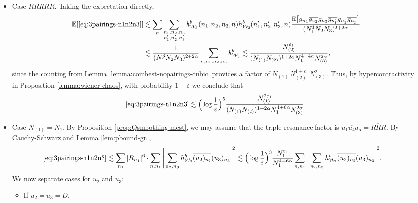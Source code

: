 \documentclass[11pt, xcolor = dvipsnames,reqno
]{amsart}
\theoremstyle{definition}
\theoremstyle{remark}
\begin{document}
    \begin{itemize}
        \item Case $RRRRR$. Taking the expectation directly, 
        \begin{align}
            \mathbb E [\eqref{eq:3pairings-n1n2n3}]
            & \lesssim  \sum_n \sum_{\substack{n_1,n_2,n_3 \\ n_1',n_2',n_3'}} h^b_{\mathcal W_3}(n_1,n_2,n_3,n) h^b_{\mathcal W_3}(n_1',n_2',n_3',n) \frac{\mathbb E \big[ g_{n_1} \overline{g_{n_2}} g_{n_3} \overline{g_{n_1'}} g_{n_2'} \overline{g_{n_3'}} \big]}{(N_1^3 N_2 N_3)^{2 + 2\alpha}}\\
            & \lesssim \frac{1}{(N_1^3 N_2 N_3)^{2 + 2\alpha}} \sum_{n,n_1,n_2,n_3}h^b_{\mathcal W_3} \lesssim \frac{  N_{(2)}^{\varepsilon_1} }{(N_{(1)}N_{(2)})^{1+2\alpha} N_1^{4 + 4\alpha} N_{(3)}^{2\alpha}},
        \end{align}
        since the counting from Lemma \ref{lemma:combest-nopairings-cubic} provides a factor of $N_{(1)} \, N_{(2)}^{1+\varepsilon_1} \,  N_{(3)}^2$. Thus, by hypercontractivity in Proposition \ref{lemma:wiener-chaos}, with probability $1 - \varepsilon$ we conclude that
        \begin{align}\label{eq:wiener-app3}
            \eqref{eq:3pairings-n1n2n3} \lesssim \Big( \log \frac{1}{\varepsilon} \Big)^5 \frac{  N_{(1)}^{2\varepsilon_1} }{(N_{(1)}N_{(2)})^{1+2\alpha} N_1^{4 + 6\alpha} N_{(3)}^{2\alpha}}.
        \end{align}
        \item Case $N_{(1)} = N_1$. By Proposition \ref{prop:Qsmoothing-mest}, we may assume that the triple resonance factor is $u_1 \overline{u_4} u_5 = R \overline R R$. By Cauchy-Schwarz and Lemma \ref{lem:pbound-gn}, 
    \begin{align}\label{eq:3pairings-n1n2n3-int1}
        \eqref{eq:3pairings-n1n2n3} &\lesssim   \sum_{n_1} |R_{n_1}|^6  \cdot   
        \sum_{n, n_1}  \Bigg|  \sum_{n_2,n_3} h^b_{\mathcal{W}_3} \overline{(u_2)_{n_2}} (u_3)_{n_3} \Bigg|^2
        \lesssim 
        \Big(\log  \frac{1}{\varepsilon} \Big)^3 \frac{N_1^{\varepsilon_1}}{N_1^{4+6\alpha}} 
        \sum_{n, n_1} \Bigg|  \sum_{n_2,n_3} h^b_{\mathcal{W}_3} \overline{(u_2)_{n_2}} (u_3)_{n_3} \Bigg|^2.
    \end{align} 
    We now separate cases for $u_2$ and $u_3$: 
    \vspace{0.25cm}
        \begin{itemize}
            \item If $u_2 = u_3 = D$,  

\end{itemize}
\end{itemize}
\end{document}

